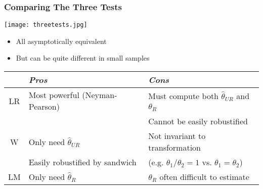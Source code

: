 \documentclass{beamer}
\begin{document}
\begin{frame}
\frametitle{Comparing The Three Tests}
\vspace{-.2in}
\begin{center}
\texttt{[image: threetests.jpg]}
\end{center}
\vspace{-.2in}
\begin{itemize}
\item All asymptotically equivalent
\item But can be quite different in small samples
\end{itemize}
\pause
{\small
\begin{tabular}{cll}
\hline\hline
   & {\it Pros}                           & {\it Cons} \\
\hline\hline
LR & Most powerful (Neyman-Pearson) & Must compute both $\hat\theta_{UR}$ and $\hat\theta_{R}$ \\
   &                                & Cannot be easily robustified \pause \\
\hline
W  & Only need $\hat\theta_{UR}$     & Not invariant to transformation \\
   & Easily robustified by sandwich & (e.g. $\theta_1/\theta_2 = 1$ vs. $\theta_1=\theta_2$) \pause \\
\hline
LM & Only need $\hat\theta_{R}$      & $\hat\theta_{R}$ often difficult to estimate \\
\hline\hline
\end{tabular}
}
\end{frame}
\end{document}
